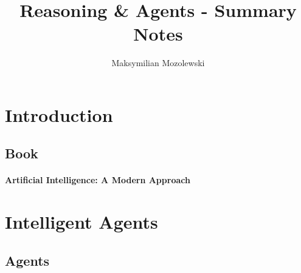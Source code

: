 \documentclass{article}
\begin{document}
\title{Reasoning \& Agents - Summary Notes}
\author{Maksymilian Mozolewski}
\maketitle
\pagebreak
\tableofcontents
{}



\section{Introduction}
\subsection{Book}
\paragraph{Artificial Intelligence: A Modern Approach}

\section{Intelligent Agents}

\subsection{Agents}
\end{document}
